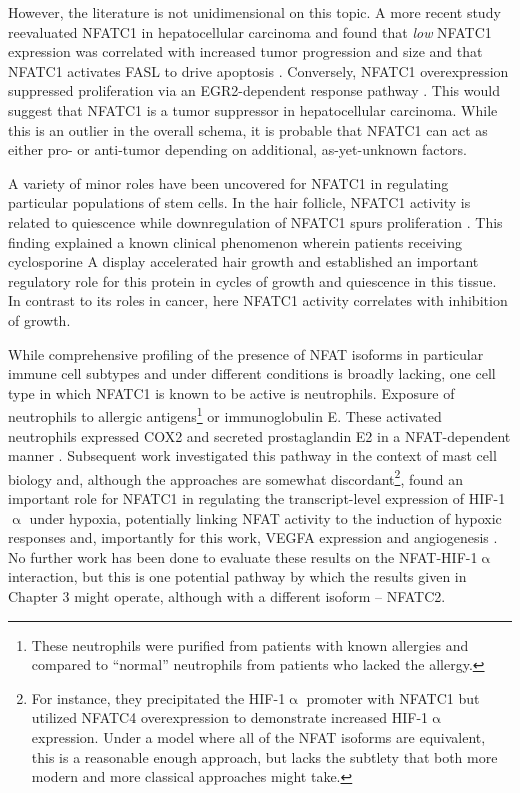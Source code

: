 However, the literature is not unidimensional on this topic. A more recent study reevaluated NFATC1 in hepatocellular carcinoma and found that \textit{low} NFATC1 expression was correlated with increased tumor progression and size and that NFATC1 activates FASL to drive apoptosis \citep{Xu2018}. Conversely, NFATC1 overexpression suppressed proliferation via an EGR2\hyp{}dependent response pathway \citep{Wang2020}. This would suggest that NFATC1 is a tumor suppressor in hepatocellular carcinoma. While this is an outlier in the overall schema, it is probable that NFATC1 can act as either pro\hyp{} or anti\hyp{}tumor depending on additional, as\hyp{}yet\hyp{}unknown factors. 

A variety of minor roles have been uncovered for NFATC1 in regulating particular populations of stem cells. In the hair follicle, NFATC1 activity is related to quiescence while downregulation of NFATC1 spurs proliferation \citep{Horsley2008, Keyes2013}. This finding explained a known clinical phenomenon wherein patients receiving cyclosporine A display accelerated hair growth and established an important regulatory role for this protein in cycles of growth and quiescence in this tissue. In contrast to its roles in cancer, here NFATC1 activity correlates with inhibition of growth. 

While comprehensive profiling of the presence of NFAT isoforms in particular immune cell subtypes and under different conditions is broadly lacking, one cell type in which NFATC1 is known to be active is neutrophils. Exposure of neutrophils to allergic antigens\footnote{These neutrophils were purified from patients with known allergies and compared to ``normal'' neutrophils from patients who lacked the allergy.} or immunoglobulin E. These activated neutrophils expressed COX2 and secreted prostaglandin E2 in a NFAT\hyp{}dependent manner \citep{Vega2007}. Subsequent work investigated this pathway in the context of mast cell biology and, although the approaches are somewhat discordant\footnote{For instance, they precipitated the HIF\hyp{}1$\upalpha$ promoter with NFATC1 but utilized NFATC4 overexpression to demonstrate increased HIF\hyp{}1$\upalpha$ expression. Under a model where all of the NFAT isoforms are equivalent, this is a reasonable enough approach, but lacks the subtlety that both more modern and more classical approaches might take.}, found an important role for NFATC1 in regulating the transcript\hyp{}level expression of HIF\hyp{}1$\upalpha$ under hypoxia, potentially linking NFAT activity to the induction of hypoxic responses and, importantly for this work, VEGFA expression and angiogenesis \citep{WalczakDrzewiecka2008}. No further work has been done to evaluate these results on the NFAT\hyp{}HIF\hyp{}1$\upalpha$ interaction, but this is one potential pathway by which the results given in Chapter 3 might operate, although with a different isoform -- NFATC2.


